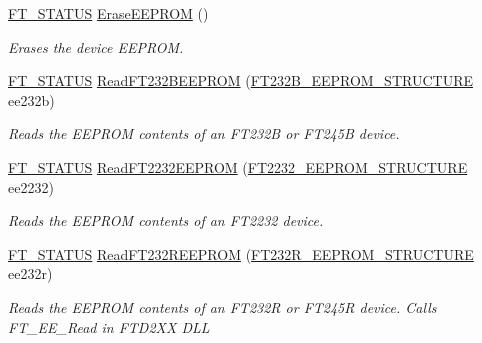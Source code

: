 \begin{DoxyCompactItemize}
\mbox{\hyperlink{class_f_t_d2_x_x___n_e_t_1_1_f_t_d_i_aabe20ad905cc4ccc1e35dd5b877d9a83}{F\+T\+\_\+\+S\+T\+A\+T\+US}} \mbox{\hyperlink{class_f_t_d2_x_x___n_e_t_1_1_f_t_d_i_a32056325577415f3f99420a1b81f4965}{Erase\+E\+E\+P\+R\+OM}} ()
\begin{DoxyCompactList}\small\item\em Erases the device E\+E\+P\+R\+OM. \end{DoxyCompactList}\item 
\mbox{\hyperlink{class_f_t_d2_x_x___n_e_t_1_1_f_t_d_i_aabe20ad905cc4ccc1e35dd5b877d9a83}{F\+T\+\_\+\+S\+T\+A\+T\+US}} \mbox{\hyperlink{class_f_t_d2_x_x___n_e_t_1_1_f_t_d_i_a8e5ae627da7cb311dd416adaf981465f}{Read\+F\+T232\+B\+E\+E\+P\+R\+OM}} (\mbox{\hyperlink{class_f_t_d2_x_x___n_e_t_1_1_f_t_d_i_1_1_f_t232_b___e_e_p_r_o_m___s_t_r_u_c_t_u_r_e}{F\+T232\+B\+\_\+\+E\+E\+P\+R\+O\+M\+\_\+\+S\+T\+R\+U\+C\+T\+U\+RE}} ee232b)
\begin{DoxyCompactList}\small\item\em Reads the E\+E\+P\+R\+OM contents of an F\+T232B or F\+T245B device. \end{DoxyCompactList}\item 
\mbox{\hyperlink{class_f_t_d2_x_x___n_e_t_1_1_f_t_d_i_aabe20ad905cc4ccc1e35dd5b877d9a83}{F\+T\+\_\+\+S\+T\+A\+T\+US}} \mbox{\hyperlink{class_f_t_d2_x_x___n_e_t_1_1_f_t_d_i_a72133fd957d4e299d08fdbb8d669ba9a}{Read\+F\+T2232\+E\+E\+P\+R\+OM}} (\mbox{\hyperlink{class_f_t_d2_x_x___n_e_t_1_1_f_t_d_i_1_1_f_t2232___e_e_p_r_o_m___s_t_r_u_c_t_u_r_e}{F\+T2232\+\_\+\+E\+E\+P\+R\+O\+M\+\_\+\+S\+T\+R\+U\+C\+T\+U\+RE}} ee2232)
\begin{DoxyCompactList}\small\item\em Reads the E\+E\+P\+R\+OM contents of an F\+T2232 device. \end{DoxyCompactList}\item 
\mbox{\hyperlink{class_f_t_d2_x_x___n_e_t_1_1_f_t_d_i_aabe20ad905cc4ccc1e35dd5b877d9a83}{F\+T\+\_\+\+S\+T\+A\+T\+US}} \mbox{\hyperlink{class_f_t_d2_x_x___n_e_t_1_1_f_t_d_i_a14db2a1cce4a2242837b9c5d6a8cefa8}{Read\+F\+T232\+R\+E\+E\+P\+R\+OM}} (\mbox{\hyperlink{class_f_t_d2_x_x___n_e_t_1_1_f_t_d_i_1_1_f_t232_r___e_e_p_r_o_m___s_t_r_u_c_t_u_r_e}{F\+T232\+R\+\_\+\+E\+E\+P\+R\+O\+M\+\_\+\+S\+T\+R\+U\+C\+T\+U\+RE}} ee232r)
\begin{DoxyCompactList}\small\item\em Reads the E\+E\+P\+R\+OM contents of an F\+T232R or F\+T245R device. Calls F\+T\+\_\+\+E\+E\+\_\+\+Read in F\+T\+D2\+XX D\+LL \end{DoxyCompactList}\item 

\end{DoxyCompactItemize}
